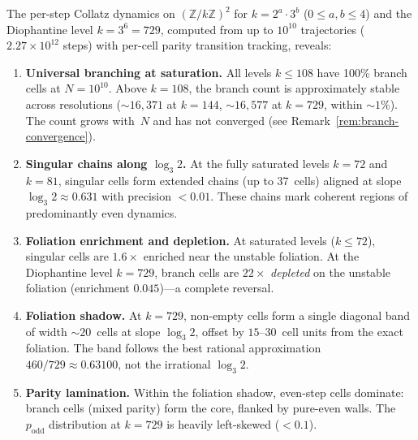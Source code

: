 \documentclass[11pt,a4paper]{article}
\newcommand{\Z}{\mathbb{Z}}
\theoremstyle{plain}
\theoremstyle{definition}
\begin{document}
\begin{mainresult}
\label{res:branch-locus}
    The per-step Collatz dynamics on $(\Z/k\Z)^2$ for $k = 2^a \cdot 3^b$
    ($0 \leq a,b \leq 4$) and the Diophantine level $k = 3^6 = 729$,
    computed from up to $10^{10}$ trajectories ($2.27 \times 10^{12}$
    steps) with per-cell parity transition tracking, reveals:
    \begin{enumerate}[label=(\roman*)]
        \item \textbf{Universal branching at saturation.}  All levels
        $k \leq 108$ have 100\% branch cells at $N = 10^{10}$.  Above
        $k = 108$, the branch count is approximately stable across
        resolutions (${\sim}16{,}371$ at $k = 144$, ${\sim}16{,}577$ at
        $k = 729$, within ${\sim}1\%$).  The count grows with~$N$ and has
        not converged (see Remark~\ref{rem:branch-convergence}).

        \item \textbf{Singular chains along $\log_3 2$.}  At the fully
        saturated levels $k = 72$ and $k = 81$, singular cells form
        extended chains (up to 37~cells) aligned at slope
        $\log_3 2 \approx 0.631$ with precision $< 0.01$.  These chains
        mark coherent regions of predominantly even dynamics.

        \item \textbf{Foliation enrichment and depletion.}  At saturated
        levels ($k \leq 72$), singular cells are $1.6\times$ enriched
        near the unstable foliation.  At the Diophantine level $k = 729$,
        branch cells are $22\times$ \emph{depleted} on the unstable foliation
        (enrichment $0.045$)---a complete reversal.

        \item \textbf{Foliation shadow.}  At $k = 729$, non-empty cells
        form a single diagonal band of width ${\sim}20$~cells at slope
        $\log_3 2$, offset by $15$--$30$~cell units from the exact
        foliation.  The band follows the best rational approximation
        $460/729 \approx 0.63100$, not the irrational $\log_3 2$.

        \item \textbf{Parity lamination.}  Within the foliation shadow,
        even-step cells dominate: branch cells (mixed parity) form the
        core, flanked by pure-even walls.  The $p_{\mathrm{odd}}$
        distribution at $k = 729$ is heavily left-skewed ($< 0.1$).


\end{enumerate}
\end{mainresult}
\end{document}

